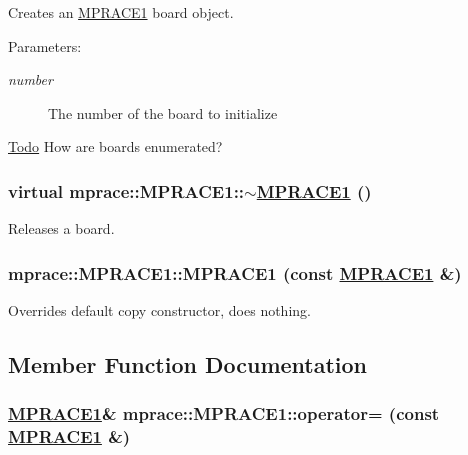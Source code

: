 Creates an \hyperlink{classmprace_1_1MPRACE1}{MPRACE1} board object. 

\begin{Desc}
\item[Parameters:]
\begin{description}
\item[{\em number}]The number of the board to initialize \end{description}
\end{Desc}
\begin{Desc}
\item[\hyperlink{todo__todo000002}{Todo}]How are boards enumerated? \end{Desc}
\hypertarget{classmprace_1_1MPRACE1_a1}{
\subsubsection[$\sim$MPRACE1]{\setlength{\rightskip}{0pt plus 5cm}virtual mprace::MPRACE1::$\sim$\hyperlink{classmprace_1_1MPRACE1}{MPRACE1} ()}}
\label{classmprace_1_1MPRACE1_a1}


Releases a board. 

\hypertarget{classmprace_1_1MPRACE1_b0}{
\subsubsection[MPRACE1]{\setlength{\rightskip}{0pt plus 5cm}mprace::MPRACE1::MPRACE1 (const \hyperlink{classmprace_1_1MPRACE1}{MPRACE1} \&)}}
\label{classmprace_1_1MPRACE1_b0}


Overrides default copy constructor, does nothing. 



\subsection{Member Function Documentation}
\hypertarget{classmprace_1_1MPRACE1_b1}{
\subsubsection[operator=]{\setlength{\rightskip}{0pt plus 5cm}\hyperlink{classmprace_1_1MPRACE1}{MPRACE1}\& mprace::MPRACE1::operator= (const \hyperlink{classmprace_1_1MPRACE1}{MPRACE1} \&)}}
\label{classmprace_1_1MPRACE1_b1}


